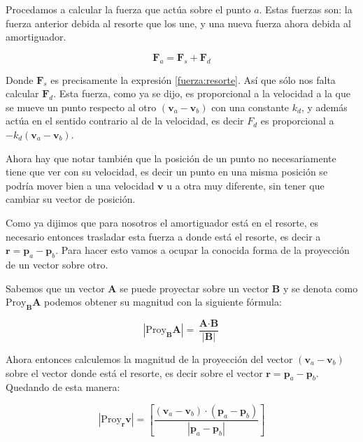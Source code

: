 Procedamos a calcular la fuerza que actúa sobre el punto $a$.
Estas fuerzas son: la fuerza anterior debida al resorte que los une, y una nueva fuerza ahora debida al amortiguador.

\begin{equation}
\textbf{F}_a = \textbf{F}_s + \textbf{F}_d
\end{equation}

Donde $\textbf{F}_s$ es precisamente la expresión \eqref{fuerza:resorte}. Así que sólo nos falta calcular $\textbf{F}_d$.
Esta fuerza, como ya se dijo, es proporcional a la velocidad a la que se mueve un punto respecto al otro $\left( \textbf{v}_a - \textbf{v}_b \right)$ con una constante $k_d$, y además actúa en el sentido contrario al de la velocidad, es decir $F_d$ es proporcional a $-k_d \left( \textbf{v}_a - \textbf{v}_b \right)$.


Ahora hay que notar también que la posición de un punto no necesariamente tiene que ver con su velocidad, es decir un punto en una misma posición se podría mover bien a una velocidad $\textbf{v}$ u a otra muy diferente, sin tener que cambiar su vector de posición.

Como ya dijimos que para nosotros el amortiguador está en el resorte, es necesario entonces trasladar esta fuerza a donde está el resorte, es decir a $\textbf{r} = \textbf{p}_a - \textbf{p}_b$.
Para hacer esto vamos a ocupar la conocida forma de la proyección de un vector sobre otro.

Sabemos que un vector $\textbf{A}$ se puede proyectar sobre un vector $\textbf{B}$ y se denota como $\mathrm{Proy}_{ \textbf{B} } \textbf{A}$ podemos obtener su magnitud con la siguiente fórmula:

\begin{equation}
| \mathrm{Proy}_{\textbf{B}} \textbf{A} | = \frac{ \textbf{A} \cdot \textbf{B} }{| \textbf{B} |}
\end{equation}

Ahora entonces calculemos la magnitud de la proyección del vector $\left( \textbf{v}_a - \textbf{v}_b \right)$ sobre el vector donde está el resorte, es decir sobre el vector $\textbf{r} = \textbf{p}_a - \textbf{p}_b$.
Quedando de esta manera:

\begin{equation}
 | \mathrm{Proy}_{ \textbf{r} } \textbf{v} | = \left[ \frac{ ( \textbf{v}_a - \textbf{v}_b ) \cdot ( \textbf{p}_a - \textbf{p}_b ) }{ | \textbf{p}_a - \textbf{p}_b | } \right]
\end{equation}

